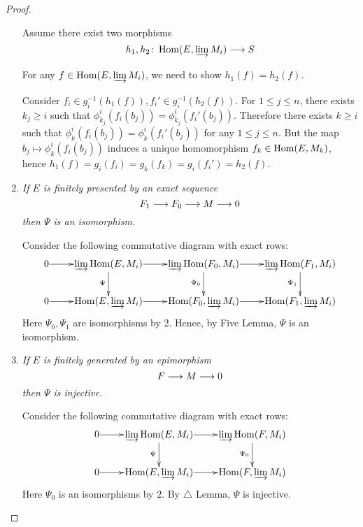 \begin{proof}
\begin{enumerate}
                 Assume there exist two morphisms
                 \begin{equation*}
                   h_1,h_2\colon\operatorname{Hom}(E,\operatorname*{\underrightarrow{\lim}} M_i)\longrightarrow S
                 \end{equation*}

                 For any $f\in\operatorname{Hom}(E,\operatorname*{\underrightarrow{\lim}} M_i)$, we need to show $h_1(f)=h_2(f)$.

                 Consider $f_i\in g_i^{-1}(h_1(f)), f_i'\in g_i^{-1}(h_2(f))$. For $1\leqslant j\leqslant n$, there exists $k_j\geqslant i$ such that $\phi^i_{k_j}(f_i(b_j))=\phi^i_{k_j}(f_i'(b_j))$. Therefore there exists $k\geqslant i$ such that $\phi^i_{k}(f_i(b_j))=\phi^i_{k}(f_i'(b_j))$ for any $1\leqslant j\leqslant n$.
                 But the map $b_j\mapsto\phi^i_{k}(f_i(b_j))$ induces a unique homomorphism $f_k\in\operatorname{Hom}(E,M_k)$, hence
                 $h_1(f)=g_i(f_i)=g_k(f_k)=g_i(f_i')=h_2(f)$.
      \item \emph{If $E$ is finitely presented by an exact sequence
                 \begin{equation*}
                   F_1\longrightarrow F_0\longrightarrow M\longrightarrow 0
                 \end{equation*}
                 then $\Psi$ is an isomorphism.}

                 Consider the following commutative diagram with exact rows:
                 \begin{displaymath}
                   \xymatrix@1{
                      0\ar[r] & \dirlim \Hom(E,M_i)\ar[r]\ar[d]_{\Psi} & \dirlim \Hom(F_0,M_i)\ar[r]\ar[d]_{\Psi_0} & \dirlim \Hom(F_1,M_i)\ar[d]_{\Psi_1} \\
                      0\ar[r] & \Hom(E,\dirlim M_i)\ar[r] & \Hom(F_0,\dirlim M_i)\ar[r] & \Hom(F_1,\dirlim M_i)              }
                 \end{displaymath}
                 Here $\Psi_0,\Psi_1$ are isomorphisms by 2.
                 Hence, by Five Lemma, $\Psi$ is an isomorphism.
      \item \emph{If $E$ is finitely generated by an epimorphism
                 \begin{equation*}
                   F\longrightarrow M\longrightarrow 0
                 \end{equation*}
                 then $\Psi$ is injective.}

                 Consider the following commutative diagram with exact rows:
                 \begin{displaymath}
                   \xymatrix@1{
                      0\ar[r] & \dirlim \Hom(E,M_i)\ar[r]\ar[d]_{\Psi} & \dirlim \Hom(F,M_i)\ar[d]_{\Psi_0}     \\
                      0\ar[r] & \Hom(E,\dirlim M_i)\ar[r] & \Hom(F,\dirlim M_i)              }
                 \end{displaymath}
                 Here $\Psi_0$ is an isomorphisms by 2.
                 By $\triangle$ Lemma, $\Psi$ is injective.
    \end{enumerate}
  \end{proof}

